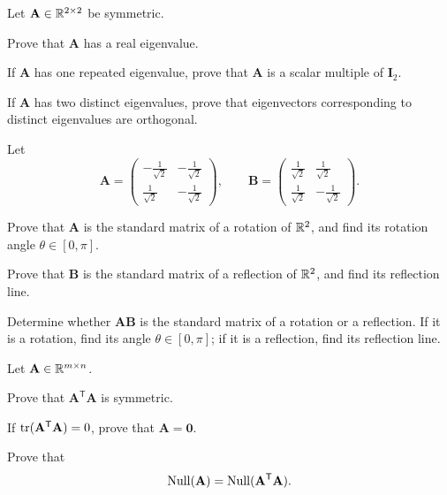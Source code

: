 \documentclass[11pt,oneside]{article}
\begin{document}
\begin{problem}
Let $\mathbf A\in\mathbb{R}^{2\times2}$ be symmetric.
\begin{problemsubparts}
\item Prove that $\mathbf A$ has a real eigenvalue.
\item If $\mathbf A$ has one repeated eigenvalue, prove that $\mathbf A$ is a scalar multiple of $\mathbf I_2$.
\item If $\mathbf A$ has two distinct eigenvalues, prove that eigenvectors corresponding to distinct eigenvalues are orthogonal.
\end{problemsubparts}
\end{problem}

\begin{problem}
Let
\[
\mathbf A=
\begin{pmatrix}
-\frac1{\sqrt2}&-\frac1{\sqrt2}\\
\frac1{\sqrt2}&-\frac1{\sqrt2}
\end{pmatrix},
\qquad
\mathbf B=
\begin{pmatrix}
\frac1{\sqrt2}&\frac1{\sqrt2}\\
\frac1{\sqrt2}&-\frac1{\sqrt2}
\end{pmatrix}.
\]
\begin{problemsubparts}
\item Prove that $\mathbf A$ is the standard matrix of a rotation of $\mathbb{R}^2$, and find its rotation angle $\theta\in[0,\pi]$.
\item Prove that $\mathbf B$ is the standard matrix of a reflection of $\mathbb{R}^2$, and find its reflection line.
\item Determine whether $\mathbf A\mathbf B$ is the standard matrix of a rotation or a reflection. If it is a rotation, find its angle $\theta\in[0,\pi]$; if it is a reflection, find its reflection line.
\end{problemsubparts}
\end{problem}

\begin{problem}
Let $\mathbf A\in\mathbb{R}^{m\times n}$.
\begin{problemsubparts}
\item Prove that $\mathbf A^{\mathsf T}\mathbf A$ is symmetric.
\item If $\operatorname{tr}(\mathbf A^{\mathsf T}\mathbf A)=0$, prove that $\mathbf A=\mathbf0$.
\item Prove that
\[
\operatorname{Null}(\mathbf A)=\operatorname{Null}(\mathbf A^{\mathsf T}\mathbf A).
\]
\end{problemsubparts}
\end{problem}
\end{document}
